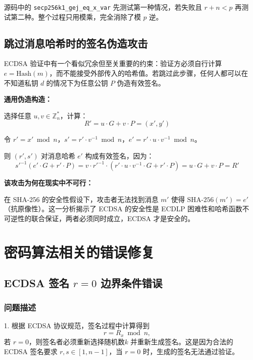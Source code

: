 \documentclass[a4paper,12pt]{ctexart}
\begin{document}
源码中的 \texttt{secp256k1\_gej\_eq\_x\_var} 先测试第一种情况，若失败且 $r+n < p$ 再测试第二种。整个过程只用模乘，完全消除了模 $p$ 逆。

\subsection{跳过消息哈希时的签名伪造攻击}

ECDSA 验证中有一个看似冗余但至关重要的约束：验证方必须自行计算$e = \text{Hash}(m)$，而不能接受外部传入的哈希值。若跳过此步骤，任何人都可以在不知道私钥 $d$ 的情况下为任意公钥 $P$ 伪造有效签名。

\textbf{通用伪造构造：}

选择任意 $u, v \in \mathbb{Z}_n^*$，计算：
$$R' = u \cdot G + v \cdot P = (x', y')$$

令 $r' = x' \bmod n$，$s' = r' \cdot v^{-1} \bmod n$，$e' = r' \cdot u \cdot v^{-1} \bmod n$。

则 $(r', s')$ 对消息哈希 $e'$ 构成有效签名，因为：
$${s'}^{-1}(e' \cdot G + r' \cdot P) = v \cdot {r'}^{-1} \cdot (r' \cdot u \cdot v^{-1} \cdot G + r' \cdot P) = u \cdot G + v \cdot P = R'$$

\textbf{该攻击为何在现实中不可行：}

在 SHA-256 的安全性假设下，攻击者无法找到消息 $m'$ 使得 $\text{SHA-256}(m') = e'$（抗原像性）。这一分析揭示了 ECDSA 的安全性是 ECDLP 困难性和哈希函数不可逆性的联合保证，两者必须同时成立，ECDSA 才是安全的。

\section{密码算法相关的错误修复}

\subsection{ECDSA 签名 $r=0$ 边界条件错误}

\subsubsection{问题描述}

1. 根据 ECDSA 协议规范，签名过程中计算得到
\[
r = R_x \bmod n,
\]
若 $r=0$，则签名者必须重新选择随机数$k$ 并重新生成签名。这是因为合法的 ECDSA 签名要求 $r,s\in[1,n-1]$，当 $r=0$ 时，生成的签名无法通过验证。
\end{document}
